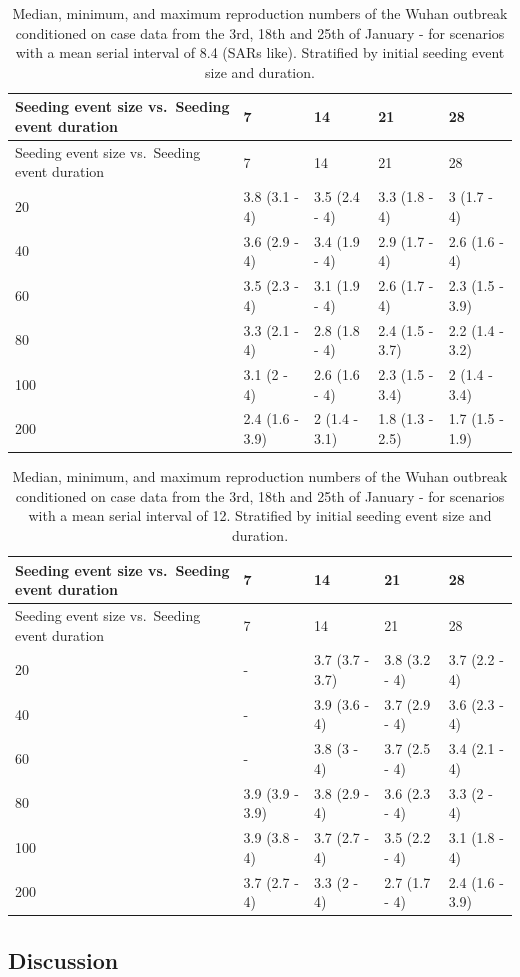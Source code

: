 \documentclass[]{article}
\begin{document}
\begin{longtable}[]{@{}lllll@{}}
\caption{Median, minimum, and maximum reproduction numbers of the Wuhan
outbreak conditioned on case data from the 3rd, 18th and 25th of January
- for scenarios with a mean serial interval of 8.4 (SARs like).
Stratified by initial seeding event size and duration.}\tabularnewline
\toprule
Seeding event size vs.~Seeding event duration & 7 & 14 & 21 &
28\tabularnewline
\midrule
\endfirsthead
\toprule
Seeding event size vs.~Seeding event duration & 7 & 14 & 21 &
28\tabularnewline
\midrule
\endhead
20 & 3.8 (3.1 - 4) & 3.5 (2.4 - 4) & 3.3 (1.8 - 4) & 3 (1.7 -
4)\tabularnewline
40 & 3.6 (2.9 - 4) & 3.4 (1.9 - 4) & 2.9 (1.7 - 4) & 2.6 (1.6 -
4)\tabularnewline
60 & 3.5 (2.3 - 4) & 3.1 (1.9 - 4) & 2.6 (1.7 - 4) & 2.3 (1.5 -
3.9)\tabularnewline
80 & 3.3 (2.1 - 4) & 2.8 (1.8 - 4) & 2.4 (1.5 - 3.7) & 2.2 (1.4 -
3.2)\tabularnewline
100 & 3.1 (2 - 4) & 2.6 (1.6 - 4) & 2.3 (1.5 - 3.4) & 2 (1.4 -
3.4)\tabularnewline
200 & 2.4 (1.6 - 3.9) & 2 (1.4 - 3.1) & 1.8 (1.3 - 2.5) & 1.7 (1.5 -
1.9)\tabularnewline
\bottomrule
\end{longtable}

\begin{longtable}[]{@{}lllll@{}}
\caption{Median, minimum, and maximum reproduction numbers of the Wuhan
outbreak conditioned on case data from the 3rd, 18th and 25th of January
- for scenarios with a mean serial interval of 12. Stratified by initial
seeding event size and duration.}\tabularnewline
\toprule
Seeding event size vs.~Seeding event duration & 7 & 14 & 21 &
28\tabularnewline
\midrule
\endfirsthead
\toprule
Seeding event size vs.~Seeding event duration & 7 & 14 & 21 &
28\tabularnewline
\midrule
\endhead
20 & - & 3.7 (3.7 - 3.7) & 3.8 (3.2 - 4) & 3.7 (2.2 - 4)\tabularnewline
40 & - & 3.9 (3.6 - 4) & 3.7 (2.9 - 4) & 3.6 (2.3 - 4)\tabularnewline
60 & - & 3.8 (3 - 4) & 3.7 (2.5 - 4) & 3.4 (2.1 - 4)\tabularnewline
80 & 3.9 (3.9 - 3.9) & 3.8 (2.9 - 4) & 3.6 (2.3 - 4) & 3.3 (2 -
4)\tabularnewline
100 & 3.9 (3.8 - 4) & 3.7 (2.7 - 4) & 3.5 (2.2 - 4) & 3.1 (1.8 -
4)\tabularnewline
200 & 3.7 (2.7 - 4) & 3.3 (2 - 4) & 2.7 (1.7 - 4) & 2.4 (1.6 -
3.9)\tabularnewline
\bottomrule
\end{longtable}

\hypertarget{discussion}{%
\subsection{Discussion}\label{discussion}}
\end{document}
